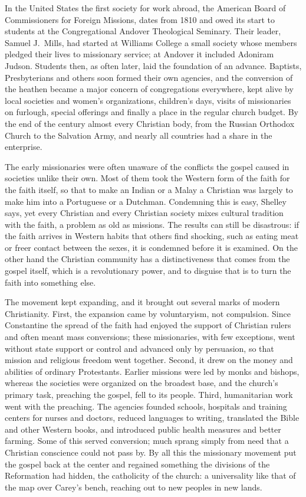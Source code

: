 In the United States the first society for work abroad, the American Board of Commissioners for Foreign Missions, dates from 1810 and owed its start to students at the Congregational Andover Theological
Seminary. Their leader, Samuel J.~Mills, had started at Williams College a small society whose
members pledged their lives to missionary service; at Andover it included Adoniram Judson. Students
then, as often later, laid the foundation of an advance. Baptists, Presbyterians and others soon
formed their own agencies, and the conversion of the heathen became a major concern of congregations
everywhere, kept alive by local societies and women's organizations, children's days, visits of
missionaries on furlough, special offerings and finally a place in the regular church budget. By the
end of the century almost every Christian body, from the Russian Orthodox Church to the Salvation Army, and nearly all countries had a share in the enterprise.

The early missionaries were often unaware of the conflicts the gospel caused in societies unlike their own. Most of them took the Western form of the faith for the faith itself, so that to make an Indian or a
Malay a Christian was largely to make him into a Portuguese or a Dutchman. Condemning this is easy,
Shelley says, yet every Christian and every Christian society mixes cultural tradition with the
faith, a problem as old as missions. The results can still be disastrous: if the faith arrives in
Western habits that others find shocking, such as eating meat or freer contact between the sexes, it
is condemned before it is examined. On the other hand the Christian community has a distinctiveness
that comes from the gospel itself, which is a revolutionary power, and to disguise that is to turn
the faith into something else.

The movement kept expanding, and it brought out several marks of modern Christianity. First, the
expansion came by voluntaryism, not compulsion. Since Constantine the spread of the faith had enjoyed
the support of Christian rulers and often meant mass conversions; these missionaries, with few
exceptions, went without state support or control and advanced only by persuasion, so that mission
and religious freedom went together. Second, it drew on the money and abilities of ordinary Protestants. Earlier missions were led by monks and bishops, whereas the societies were organized on
the broadest base, and the church's primary task, preaching the gospel, fell to its people. Third,
humanitarian work went with the preaching. The agencies founded schools, hospitals and training
centers for nurses and doctors, reduced languages to writing, translated the Bible and other Western
books, and introduced public health measures and better farming. Some of this served conversion;
much sprang simply from need that a Christian conscience could not pass by. By all this the missionary movement put the gospel back at the center and regained something the divisions of the Reformation had hidden, the catholicity of the church: a universality like that
of the map over Carey's bench, reaching out to new peoples in new lands.


